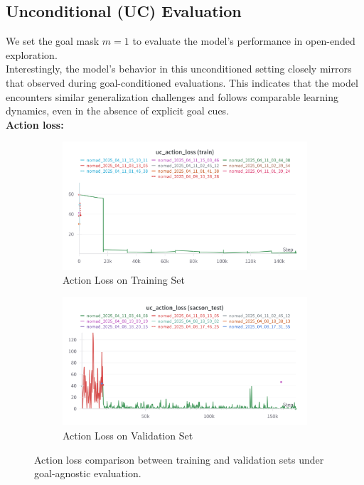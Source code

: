 \documentclass[12pt]{article}
\begin{document}
\subsection*{Unconditional (UC) Evaluation}
We set the goal mask $m = 1$ to evaluate the model's performance in open-ended exploration.\\
Interestingly, the model's behavior in this unconditioned setting closely mirrors that observed during goal-conditioned evaluations. This indicates that the model encounters similar generalization challenges and follows comparable learning dynamics, even in the absence of explicit goal cues.\\
\noindent \textbf{Action loss:}\\
\begin{figure}[H]
    \centering
    \begin{subfigure}[b]{0.48\textwidth}
        \centering
        \includegraphics[width=\textwidth]{images/uc_action_train.png}
        \caption{Action Loss on Training Set}
        \label{fig:gc_action_loss_train}
    \end{subfigure}
    \hfill
    \begin{subfigure}[b]{0.48\textwidth}
        \centering
        \includegraphics[width=\textwidth]{images/uc_action_test.png}
        \caption{Action Loss on Validation Set}
        \label{fig:gc_action_loss_val}
    \end{subfigure}
    \caption{Action loss comparison between training and validation sets under goal-agnostic evaluation.}
\end{figure}
\end{document}
